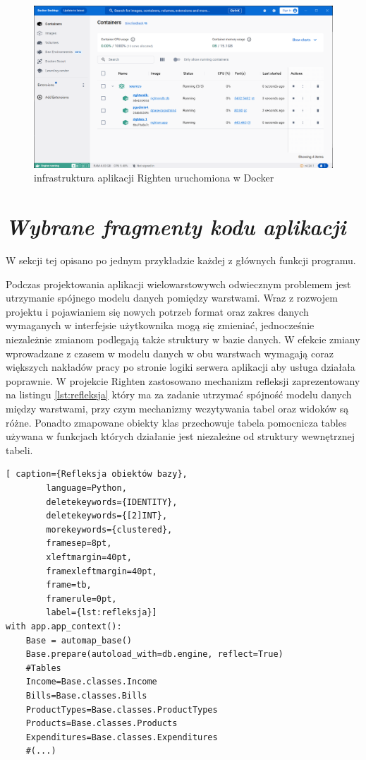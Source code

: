 \documentclass[a4paper, 10pt, twoside, openright]{report}
\newcommand{\customstylesection}[1]{\textbf{\textit{#1}}}
\begin{document}
\begin{large}
\begin{figure}[H]           %
    \centering
    \includegraphics[width=12cm]{figures/Righten_environment_docker.png}
    \caption{infrastruktura aplikacji Righten uruchomiona w Docker}
    \label{fig:rightenenvironmentdocker}
\end{figure}

\section{\customstylesection{Wybrane fragmenty kodu aplikacji}}
{W sekcji tej opisano po jednym przykładzie każdej z głównych funkcji programu.}

{Podczas projektowania aplikacji wielowarstowywch odwiecznym problemem jest 
utrzymanie spójnego modelu danych pomiędzy warstwami. Wraz z rozwojem projektu i
 pojawianiem się nowych potrzeb format oraz zakres danych wymaganych w 
interfejsie użytkownika mogą się zmieniać, jednocześnie niezależnie zmianom 
podlegają także struktury w bazie danych. W efekcie zmiany wprowadzane z czasem 
w modelu danych w obu warstwach wymagają coraz większych nakładów pracy po 
stronie logiki serwera aplikacji aby usługa działała poprawnie. W projekcie 
Righten zastosowano mechanizm refleksji \cite{refleksja} zaprezentowany na 
listingu \ref*{lst:refleksja} który ma za zadanie utrzymać spójność modelu 
danych między warstwami, przy czym mechanizmy wczytywania tabel oraz widoków są 
różne. Ponadto zmapowane obiekty klas przechowuje tabela pomocnicza tables 
używana w funkcjach których działanie jest niezależne od struktury wewnętrznej 
tabeli.}

\begin{minipage}{\textwidth}
    \begin{lstlisting}[ caption={Refleksja obiektów bazy},
        language=Python,
        deletekeywords={IDENTITY},
        deletekeywords={[2]INT},
        morekeywords={clustered},
        framesep=8pt,
        xleftmargin=40pt,
        framexleftmargin=40pt,
        frame=tb,
        framerule=0pt,
        label={lst:refleksja}]
with app.app_context():
    Base = automap_base() 
    Base.prepare(autoload_with=db.engine, reflect=True)
    #Tables
    Income=Base.classes.Income
    Bills=Base.classes.Bills
    ProductTypes=Base.classes.ProductTypes
    Products=Base.classes.Products
    Expenditures=Base.classes.Expenditures
    #(...)


\end{lstlisting}
\end{minipage}
\end{large}
\end{document}
